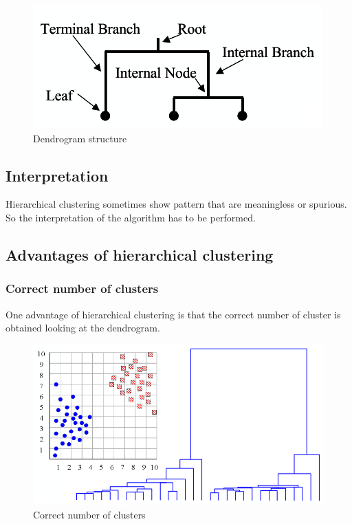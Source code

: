 	\begin{figure}[H]
		\includegraphics[width=\textwidth]{dendrogram}
		\caption{Dendrogram structure}
		\label{fig:dendrogram}
	\end{figure}

		\subsection{Interpretation}
		Hierarchical clustering sometimes show pattern that are meaningless or spurious.
		So the interpretation of the algorithm has to be performed.

		\subsection{Advantages of hierarchical clustering}

			\subsubsection{Correct number of clusters}
			One advantage of hierarchical clustering is that the correct number of cluster is obtained looking at the dendrogram.

				\begin{figure}[H]
					\includegraphics[width=\textwidth]{correct-number}
					\caption{Correct number of clusters}
					\label{fig:correct-number}
				\end{figure}

